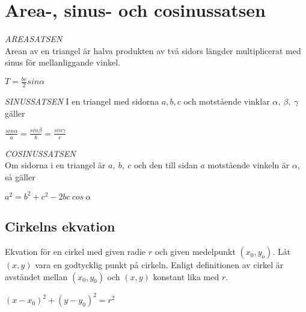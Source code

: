 \documentclass[11pt]{article}
\begin{document}
\section{Area-, sinus- och cosinussatsen}
\emph{AREASATSEN} \\
Arean av en triangel är halva produkten av två sidors längder multiplicerat med sinus för mellanliggande vinkel. 
\begin{center}	
	$	T = \frac{bc}{2}sin\alpha $
\end{center}
\begin{figure}[h]
  \begin{center}
  \end{center}
  \label{bild3}
\end{figure}
\clearpage
\noindent\emph{SINUSSATSEN}
I en triangel med sidorna $ a, b, c$ och motstående vinklar $\alpha, ~\beta, ~\gamma$~ gäller \\
\begin{center}
$\frac{sin\alpha}{a} = \frac{sin\beta}{b} = \frac{sin\gamma}{c} $
\end{center}
\begin{figure}[h]
  \begin{center}
  \end{center}
  \label{bild3}
\end{figure}
\emph{COSINUSSATSEN} \\
Om sidorna i en triangel är $a, ~b, ~c$ och den till sidan $a$ motstående vinkeln är $\alpha$, så gäller
\begin{center}
$ a^2 = b^2 + c^2 - 2bc~cos~\alpha $
\end{center}   
\begin{figure}[h]
  \begin{center}
  \end{center}
  \label{bild3}
\end{figure}


\subsection{Cirkelns ekvation}
Ekvation för en cirkel med given radie $r$ och given medelpunkt $(x_0,y_o)$. Låt $(x,y)$ vara en godtycklig punkt på cirkeln. Enligt definitionen av cirkel är avståndet mellan $(x_0,y_0)$ och $(x,y)$ konstant lika med $r$. 
\begin{center}
$ (x-x_0)^2 + (y-y_0)^2 = r^2 $
\end{center}
\end{document}
